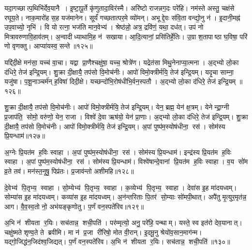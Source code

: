 यदा॒गच्छात्प॒थिभि॑र्देव॒यानै। इ॒ष्टा॒पू॒र्ते कृ॑णुतादा॒विर॑स्मै। अरि॑ष्टो राजन्नग॒दः परे॑हि। नम॑स्ते अस्तु॒ चक्ष॑से रघूय॒ते। नाक॒मारो॑ह स॒ह यज॑मानेन। सूर्यं॑ गच्छतात्पर॒मे व्यो॑मन्। अभूद्दे॒वः स॑वि॒ता वन्द्यो॒नु न॑। इ॒दानी॒मह्न॑ उप॒वाच्यो॒ नृभि॑। वि यो रत्ना॒ भज॑ति मान॒वेभ्य॑। श्रेष्ठ॑न्नो॒ अत्र॒ द्रवि॑णं॒ यथा॒ दध॑त्। उप॑ नो मित्रावरुणावि॒हाव॑तम्। अ॒न्वादीध्याथामि॒ह न॑ सखाया। आ॒दि॒त्यानां॒ प्रसि॑तिर्\mbox{}हे॒तिः। उ॒ग्रा श॒तापाष्ठा घ॒विषा॒ परि॑ णो वृणक्तु। आप्या॑यस्व॒ सन्ते॥१२५॥\anuvakamend[त्मना॒ जाय॑मानोऽस्य॒ दध॒त्पञ्च॑ च]

यद्दि॑दी॒क्षे मन॑सा॒ यच्च॑ वा॒चा। यद्वा प्रा॒णैश्चक्षु॑षा॒ यच्च॒ श्रोत्रे॑ण। यद्रेत॑सा मिथु॒नेनाप्या॒त्मना। अ॒द्भ्यो लो॒का द॑धिरे॒ तेज॑ इन्द्रि॒यम्। शु॒क्रा दी॒क्षायै॒ तप॑सो वि॒मोच॑नीः। आपो॑ विमो॒क्त्रीर्मयि॒ तेज॑ इन्द्रि॒यम्। यदृ॒चा साम्ना॒ यजु॑षा। प॒शू॒नाञ्चर्म॑न् ह॒विषा॑ दिदी॒क्षे। यच्छन्दो॑भि॒रोष॑धीभि॒र्वन॒स्पतौ। अ॒द्भ्यो लो॒का द॑धिरे॒ तेज॑ इन्द्रि॒यम् ॥१२६॥

शु॒क्रा दी॒क्षायै॒ तप॑सो वि॒मोच॑नीः। आपो॑ विमो॒क्त्रीर्मयि॒ तेज॑ इन्द्रि॒यम्। येन॒ ब्रह्म॒ येन॑ क्ष॒त्रम्। येनेन्द्रा॒ग्नी प्र॒जाप॑ति॒ सोमो॒ वरु॑णो॒ येन॒ राजा। विश्वे॑ दे॒वा ऋष॑यो॒ येन॑ प्रा॒णाः। अ॒द्भ्यो लो॒का द॑धिरे॒ तेज॑ इन्द्रि॒यम्। शु॒क्रा दी॒क्षायै॒ तप॑सो वि॒मोच॑नीः। आपो॑ विमो॒क्त्रीर्मयि॒ तेज॑ इन्द्रि॒यम्। अ॒पां पुष्प॑म॒स्योष॑धीना॒ रस॑। सोम॑स्य प्रि॒यन्धाम॑॥१२७॥

अ॒ग्नेः प्रि॒यत॑म ह॒विः स्वाहा। अ॒पां पुष्प॑म॒स्योष॑धीना॒ रस॑। सोम॑स्य प्रि॒यन्धाम॑। इन्द्र॑स्य प्रि॒यत॑म ह॒विः स्वाहा। अ॒पां पुष्प॑म॒स्योष॑धीना॒ रस॑। सोम॑स्य प्रि॒यन्धाम॑। विश्वे॑षान्दे॒वानां प्रि॒यत॑म ह॒विः स्वाहा। व॒य सो॑म व्र॒ते तव॑। मन॑स्त॒नूषु॒ पिप्र॑तः। प्र॒जाव॑न्तो अशीमहि॥१२८॥

दे॒वेभ्य॑ पि॒तृभ्य॒ स्वाहा। सो॒म्येभ्य॑ पि॒तृभ्य॒ स्वाहा। क॒व्येभ्य॑ पि॒तृभ्य॒ स्वाहा। देवा॑स इ॒ह मा॑दयध्वम्। सोम्या॑स इ॒ह मा॑दयध्वम्। कव्या॑स इ॒ह मा॑दयध्वम्। अ॒न॑न्तरिताः पि॒तर॑ सो॒म्याः सो॑मपी॒थात्। अपै॑तु मृ॒त्युर॒मृत॑न्न॒ आग\sn{}। वै॒व॒स्व॒तो नो॒ अभ॑यङ्कृणोतु। प॒र्णं वन॒स्पते॑रिव॥१२९॥

अ॒भि न॑ शीयता र॒यिः। सच॑तान्न॒ शची॒पति॑। पर॑म्मृत्यो॒ अनु॒ परे॑हि॒ पन्थाम्। यस्ते॒ स्व इत॑रो देव॒यानात्। चक्षु॑ष्मते शृण्व॒ते ते ब्रवीमि। मा न॑ प्र॒जा री॑रिषो॒ मोत वी॒रान्। इ॒दमू॒नु श्रेयो॑व॒सान॒माग॑न्म। यद्गो॒जिद्ध॑न॒जिद॑श्व॒जिद्यत्। प॒र्णं वन॒स्पते॑रिव। अ॒भि न॑ शीयता र॒यिः। सच॑तान्न॒ शची॒पति॑॥१३०॥


